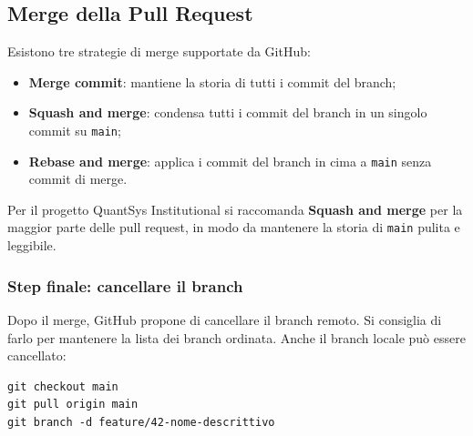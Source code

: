 \subsection{Merge della Pull Request}

Esistono tre strategie di merge supportate da GitHub:

\begin{itemize}
  \item \textbf{Merge commit}: mantiene la storia di tutti i commit del branch;
  \item \textbf{Squash and merge}: condensa tutti i commit del branch in un singolo commit su \texttt{main};
  \item \textbf{Rebase and merge}: applica i commit del branch in cima a \texttt{main} senza commit di merge.
\end{itemize}

Per il progetto QuantSys Institutional si raccomanda \textbf{Squash and merge} per la maggior parte delle pull request, in modo da mantenere la storia di \texttt{main} pulita e leggibile.

\subsubsection{Step finale: cancellare il branch}

Dopo il merge, GitHub propone di cancellare il branch remoto. Si consiglia di farlo per mantenere la lista dei branch ordinata. Anche il branch locale può essere cancellato:

\begin{lstlisting}
git checkout main
git pull origin main
git branch -d feature/42-nome-descrittivo
\end{lstlisting}
